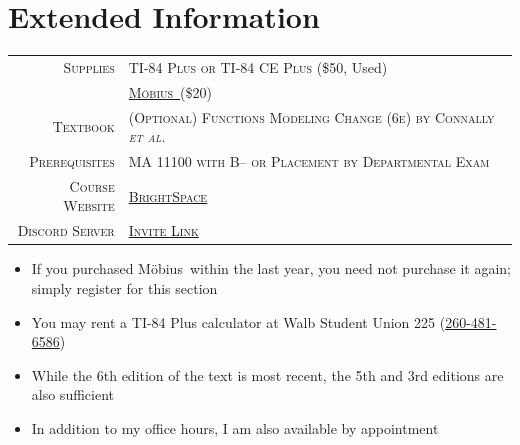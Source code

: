 \documentclass[letterpaper,twoside]{article}
\def\Mobius{M\"obius\ }
\begin{document}
\section*{Extended Information}
\large
\begin{table}[H]
    \centering
    \doublespacing
    \begin{tabular}{rl}
        \textsc{Supplies} & \textsc{TI-84 Plus or TI-84 CE Plus} (\$50, Used)\\
        & \href{https://pfw.mobius.cloud/login}{\textsc{\Mobius}}(\$20)\\
        \textsc{Textbook} & \textsc{(Optional) Functions Modeling Change (6e) by Connally \textit{et al.}}\\
        \textsc{Prerequisites} & \textsc{MA 11100 with B-- or Placement by Departmental Exam}\\
        \textsc{Course Website} & \href{https://purdue.brightspace.com}{\textsc{BrightSpace}}\\
        \textsc{Discord Server} & \href{https://discord.gg/t3fPxS8vvK}{\textsc{Invite Link}}\\
    \end{tabular}
\end{table}
\normalsize

\begin{itemize}
    \item If you purchased \Mobius within the last year, you need not purchase it again; simply register for this section
    \item You may rent a TI-84 Plus calculator at Walb Student Union 225 (\href{tel:12604816586}{260-481-6586})
    \item While the 6th edition of the text is most recent, the 5th and 3rd editions are also sufficient
    \item In addition to my office hours, I am also available by appointment
\end{itemize}
\end{document}
